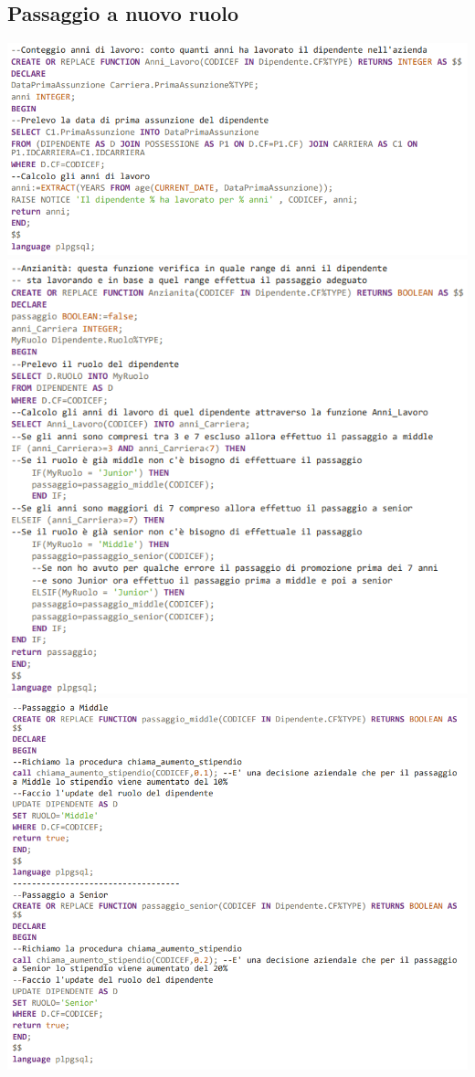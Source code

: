 \subsection{Passaggio a nuovo ruolo}
\includegraphics[width=1.1\textwidth]{Immagini/funzione3anni.sql}
\includegraphics[width=1\textwidth]{Immagini/anzianita.sql}
\includegraphics[width=1\textwidth]{Immagini/passaggio.sql}
